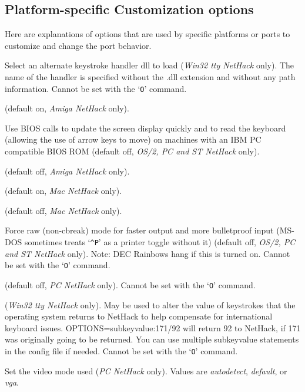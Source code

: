 \subsection*{Platform-specific Customization options}

Here are explanations of options that are used by specific platforms 
or ports to customize and change the port behavior.

\blist{}
\item[\ib{altkeyhandler}]
Select an alternate keystroke handler dll to load ({\it Win32 tty\/ NetHack\/} only).
The name of the handler is specified without the .dll extension and without any
path information.
Cannot be set with the `{\tt O}' command.
\item[\ib{altmeta}]
(default on, {\it Amiga NetHack \/} only).
\item[\ib{BIOS}]
Use BIOS calls to update the screen display quickly and to read the keyboard
(allowing the use of arrow keys to move) on machines with an IBM PC
compatible BIOS ROM (default off, {\it OS/2, PC\/ {\rm and} ST NetHack\/} only).
\item[\ib{flush}]
(default off, {\it Amiga NetHack \/} only).
\item[\ib{Macgraphics}]
(default on, {\it Mac NetHack \/} only).
\item[\ib{page\_wait}]
(default off, {\it Mac NetHack \/} only).
\item[\ib{rawio}]
Force raw (non-cbreak) mode for faster output and more
bulletproof input (MS-DOS sometimes treats `{\tt \^{}P}' as a printer toggle
without it) (default off, {\it OS/2, PC\/ {\rm and} ST NetHack\/} only).  
Note:  DEC Rainbows hang if this is turned on.
Cannot be set with the `{\tt O}' command.
\item[\ib{soundcard}]
(default off, {\it PC NetHack \/} only).
Cannot be set with the `{\tt O}' command.
\item[\ib{subkeyvalue}]
({\it Win32 tty NetHack \/} only).
May be used to alter the value of keystrokes that the operating system
returns to NetHack to help compensate for international keyboard issues.
OPTIONS=subkeyvalue:171/92
will return 92 to NetHack, if 171 was originally going to be returned.
You can use multiple subkeyvalue statements in the config file if needed.
Cannot be set with the `{\tt O}' command.
\item[\ib{video}]
Set the video mode used ({\it PC\/ NetHack\/} only).
Values are {\it autodetect\/}, {\it default\/}, or {\it vga\/}. 
